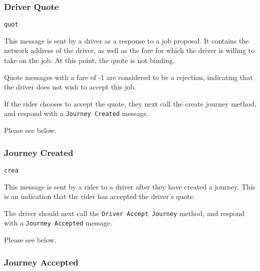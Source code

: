 

\subsubsection{Driver Quote}

\begin{description}[leftmargin=6em,style=nextline]
	\item [Topic]
		\lstinline{quot}
	\item [Purpose]
		This message is sent by a driver as a response to a job proposal. It contains the network address of the driver, as well as the fare for which the driver is willing to take on the job. At this point, the quote is not binding.
		
		Quote messages with a fare of -1 are considered to be a rejection, indicating that the driver does not wish to accept this job.
	\item [Response]
		If the rider chooses to accept the quote, they next call the create journey method, and respond with a \lstinline{Journey Created} message.
	\item [Payload]
		Please see below.
\end{description}



\subsubsection{Journey Created}

\begin{description}[leftmargin=6em,style=nextline]
	\item [Topic]
		\lstinline{crea}
	\item [Purpose]
		This message is sent by a rider to a driver after they have created a journey. This is an indication that the rider has accepted the driver's quote.
	\item [Response]
		The driver should next call the \lstinline{Driver Accept Journey} method, and respond with a \lstinline{Journey Accepted} message.
	\item [Payload]
		Please see below.
\end{description}



\subsubsection{Journey Accepted}

